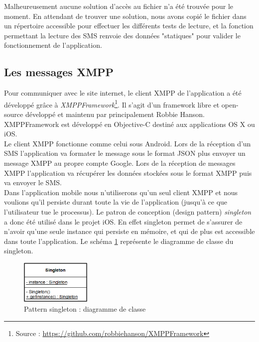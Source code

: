 Malheureusement aucune solution d'accès au fichier n'a été trouvée pour le moment.
En attendant de trouver une solution, nous avons copié le fichier dans un répertoire accessible pour effectuer les différents tests de lecture, et la fonction permettant la lecture des SMS renvoie des données "statiques" pour valider le fonctionnement de l'application.




\subsection{Les messages XMPP}

Pour communiquer avec le site internet, le client XMPP de l'application a été développé grâce à \textit{XMPPFramework}\footnote{Source : \href{https://github.com/robbiehanson/XMPPFramework}{https://github.com/robbiehanson/XMPPFramework}}.
Il s'agit d'un framework libre et open-source développé et maintenu par principalement Robbie Hanson.
XMPPFramework est développé en Objective-C destiné aux applications OS X ou iOS.
\\


Le client XMPP fonctionne comme celui sous Android.
Lors de la réception d'un SMS l'application va formater le message sous le format JSON plus envoyer un message XMPP au propre compte Google.
Lors de la réception de messages XMPP l'application va récupérer les données stockées sous le format XMPP puis va envoyer le SMS.
\\


Dans l'application mobile nous n'utiliserons qu'un seul client XMPP et nous voulions qu'il persiste durant toute la vie de l'application (jusqu'à ce que l'utilisateur tue le processus).
Le patron de conception (design pattern) \textit{singleton} a donc été utilisé dans le projet iOS.
En effet singleton permet de s'assurer de n'avoir qu'une seule instance qui persiste en mémoire, et qui de plus est accessible dans toute l'application.
Le schéma \ref{pattern_singleton} représente le diagramme de classe du singleton.
\begin{figure}[!h]
	\center
	\includegraphics[width=0.3\textwidth]{img/pattern_singleton.png}
	\caption{Pattern singleton : diagramme de classe}
	\label{pattern_singleton}
\end{figure}
